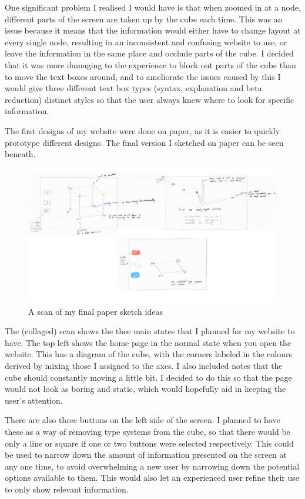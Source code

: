 \documentclass{l4proj}
\begin{document}
One significant problem I realised I would have is that when zoomed in at a node, different parts of the screen are taken up by the cube each time.  This was an issue because it means that the information would either have to change layout at every single node, resulting in an inconsistent and confusing website to use, or leave the information in the same place and occlude parts of the cube.  I decided that it was more damaging to the experience to block out parts of the cube than to move the text boxes around, and to ameliorate the issues caused by this I would give three different text box types (syntax, explanation and beta reduction) distinct styles so that the user always knew where to look for specific information.

The first designs of my website were done on paper, as it is easier to quickly prototype different designs.  The final version I sketched on paper can be seen beneath.

\begin{figure}[h!]
    \centering
    \includegraphics[width=1\linewidth]{dissertation/images/paper_collaged_taller.png}
    \caption{A scan of my final paper sketch ideas}
    \label{fig:enter-label}
\end{figure}

The (collaged) scan shows the thee main states that I planned for my website to have.  The top left shows the home page in the normal state when you open the website.  This has a diagram of the cube, with the corners labeled in the colours derived by mixing those I assigned to the axes.  I also included notes that the cube should constantly moving a little bit.  I decided to do this so that the page would not look as boring and static, which would hopefully aid in keeping the user's attention.  

There are also three buttons on the left side of the screen.  I planned to have these as a way of removing type systems from the cube, so that there would be only a line or square if one or two buttons were selected respectively.  This could be used to narrow down the amount of information presented on the screen at any one time, to avoid overwhelming a new user by narrowing down the potential options available to them.  This would also let an experienced user refine their use to only show relevant information.
\end{document}
